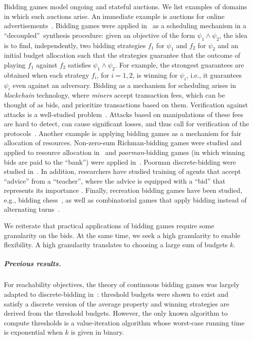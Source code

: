 \documentclass{theoretics}
\begin{document}
Bidding games model ongoing and stateful auctions. We list examples of domains in which such auctions arise. An immediate example is auctions for online advertisements~\cite{Mut09}. 
Bidding games were applied in~\cite{AMS24} as a scheduling mechanism in a ``decoupled''~synthesis procedure: given an objective of the form $\psi_1 \wedge \psi_2$, the idea is to find, independently, two bidding strategies $f_1$ for $\psi_1$ and $f_2$ for $\psi_2$  and an initial budget allocation such that the strategies guarantee that the outcome of playing $f_1$ against $f_2$ satisfies $\psi_1 \wedge \psi_2$. For example, the strongest guarantees are obtained when each strategy $f_i$, for $i =1,2$, is winning for $\psi_i$, i.e., it guarantees $\psi_i$ even against an adversary. 
Bidding as a mechanism for scheduling arises in {\em blockchain} technology, where {\em miners} accept transaction fees, which can be thought of as bids, and prioritize transactions based on them. Verification against attacks is a well-studied problem~\cite{CGV18,ABC16}. Attacks based on manipulations of these fees are hard to detect, can cause significant losses, and thus call for verification of the protocols~\cite{CGV18,ABC16}. 
Another example is applying bidding games as a mechanism for fair allocation of resources. Non-zero-sum Richman-bidding games were studied and applied to resource allocation in~\cite{MKT18} and {\em poorman}-bidding games (in which winning bids are paid to the ``bank'') were applied in~\cite{BEF21}. Poorman discrete-bidding were studied in~\cite{AM+23}.
In addition, researchers have studied training of agents that accept ``advice'' from a ``teacher'', where the advice is equipped with a ``bid'' that represents its importance \cite{AK+16}.
Finally, recreation bidding games have been studied, e.g., bidding chess~\cite{BP09}, as well as combinatorial games that apply bidding instead of alternating turns~\cite{RLP21}. 

We reiterate that practical applications of bidding games require some granularity on the bids. At the same time, we seek a high granularity to enable flexibility. A high granularity translates to  choosing a large sum of budgets $k$.

\subparagraph*{Previous results.}
For reachability objectives, the theory of continuous bidding games was largely adapted to discrete-bidding in~\cite{DP10}: threshold budgets were shown to exist and satisfy a discrete version of the average property and  winning strategies are derived from the threshold budgets. However, the only known algorithm to compute thresholds is a value-iteration algorithm whose worst-case running time is exponential when $k$ is given in binary.
\end{document}

